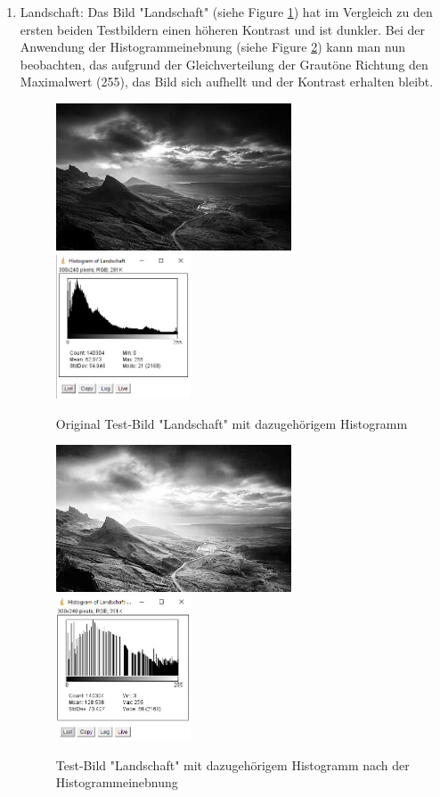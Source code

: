 \documentclass[12pt,german]{article}
\begin{document}
\begin{enumerate}
\item Landschaft: 
Das Bild "Landschaft"  (siehe Figure \ref{fig:Landschaft01}) hat im Vergleich zu den ersten beiden Testbildern einen höheren Kontrast und ist dunkler. Bei der Anwendung der Histogrammeinebnung  (siehe Figure \ref{fig:Landschaft02}) kann man nun beobachten, das aufgrund der Gleichverteilung der Grautöne Richtung den Maximalwert (255), das Bild sich aufhellt und der Kontrast erhalten bleibt.
\begin{figure}[H] \centering
	\includegraphics[width=7cm]{../testData/Results/Landschaft/Landschaft.jpg}
	\includegraphics[width=4cm]{../testData/Results/Landschaft/Landschaft-histogram.png}
	\caption{Original Test-Bild "Landschaft" mit dazugehörigem Histogramm}
	 \label{fig:Landschaft01}
\end{figure}
\begin{figure}[H] \centering
	\includegraphics[width=7cm]{../testData/Results/Landschaft/Landschaft-equalized.jpg}
	\includegraphics[width=4cm]{../testData/Results/Landschaft/Landschaft-equalized-histogram.png}
	\caption{Test-Bild "Landschaft" mit dazugehörigem Histogramm nach der Histogrammeinebnung}
	 \label{fig:Landschaft02}
\end{figure}


\end{enumerate}
\end{document}
